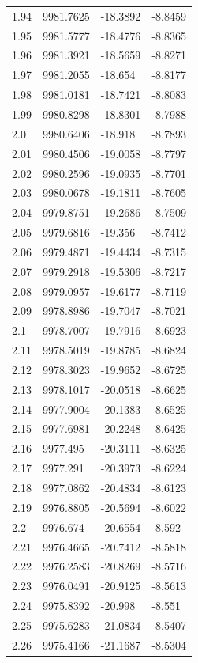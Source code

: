 \begin{table}[H]
\begin{tabular}{llll}
1.94 & 9981.7625 & -18.3892 & -8.8459 \\
1.95 & 9981.5777 & -18.4776 & -8.8365 \\
1.96 & 9981.3921 & -18.5659 & -8.8271 \\
1.97 & 9981.2055 & -18.654 & -8.8177 \\
1.98 & 9981.0181 & -18.7421 & -8.8083 \\
1.99 & 9980.8298 & -18.8301 & -8.7988 \\
2.0 & 9980.6406 & -18.918 & -8.7893 \\
2.01 & 9980.4506 & -19.0058 & -8.7797 \\
2.02 & 9980.2596 & -19.0935 & -8.7701 \\
2.03 & 9980.0678 & -19.1811 & -8.7605 \\
2.04 & 9979.8751 & -19.2686 & -8.7509 \\
2.05 & 9979.6816 & -19.356 & -8.7412 \\
2.06 & 9979.4871 & -19.4434 & -8.7315 \\
2.07 & 9979.2918 & -19.5306 & -8.7217 \\
2.08 & 9979.0957 & -19.6177 & -8.7119 \\
2.09 & 9978.8986 & -19.7047 & -8.7021 \\
2.1 & 9978.7007 & -19.7916 & -8.6923 \\
2.11 & 9978.5019 & -19.8785 & -8.6824 \\
2.12 & 9978.3023 & -19.9652 & -8.6725 \\
2.13 & 9978.1017 & -20.0518 & -8.6625 \\
2.14 & 9977.9004 & -20.1383 & -8.6525 \\
2.15 & 9977.6981 & -20.2248 & -8.6425 \\
2.16 & 9977.495 & -20.3111 & -8.6325 \\
2.17 & 9977.291 & -20.3973 & -8.6224 \\
2.18 & 9977.0862 & -20.4834 & -8.6123 \\
2.19 & 9976.8805 & -20.5694 & -8.6022 \\
2.2 & 9976.674 & -20.6554 & -8.592 \\
2.21 & 9976.4665 & -20.7412 & -8.5818 \\
2.22 & 9976.2583 & -20.8269 & -8.5716 \\
2.23 & 9976.0491 & -20.9125 & -8.5613 \\
2.24 & 9975.8392 & -20.998 & -8.551 \\
2.25 & 9975.6283 & -21.0834 & -8.5407 \\
2.26 & 9975.4166 & -21.1687 & -8.5304 \\

\end{tabular}
\end{table}
